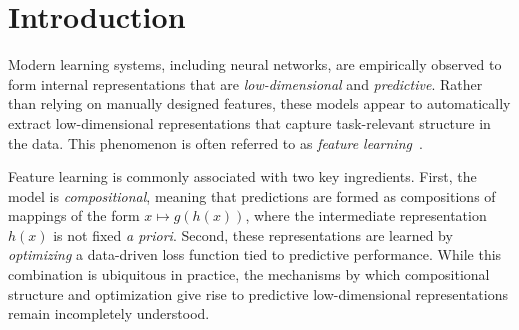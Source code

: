 \documentclass[sn-mathphys-num]{sn-jnl}%
\numberwithin{equation}{section}
\theoremstyle{thmstyleone}%
\theoremstyle{thmstyletwo}%
\theoremstyle{thmstylethree}%
\begin{document}

\section{Introduction} 
\indent\indent
Modern learning systems, including neural networks, are empirically
observed to form internal representations that are 
\emph{low-dimensional} and \emph{predictive}. Rather than relying on manually
designed features, these models appear to automatically extract low-dimensional
representations that capture task-relevant structure in the data. This
phenomenon is often referred to as \emph{feature learning}~\cite{BengioCoVi13}.  

Feature learning is commonly associated with two key ingredients.  First, the model is
\emph{compositional}, meaning that predictions are formed as compositions of mappings of
the form $x \mapsto g(h(x))$, where the intermediate representation $h(x)$ is not fixed
\emph{a priori}. Second, these representations are learned by \emph{optimizing}
a data-driven loss function tied to predictive performance. While this combination is ubiquitous 
in practice, the mechanisms by which compositional structure and optimization give rise 
to predictive low-dimensional representations remain incompletely understood.

%
\end{document}
